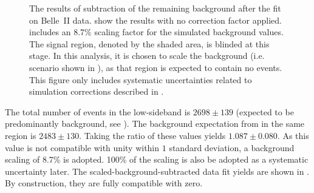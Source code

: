 \begin{figure}[htbp!]
    \centering
    \caption{\label{fig:sidebands_subtracted_figures} The results of subtraction of the remaining \BB background after the fit on Belle~II data.
     show the results with no correction factor applied.
     includes an 8.7\% scaling factor for the simulated background values.
    The signal region, denoted by the shaded area, is blinded at this stage.
    In this analysis, it is chosen to scale the background (i.e. scenario shown in ),
    as that region is expected to contain no \BtoXsgamma events.
    This figure only includes systematic uncertainties related to simulation corrections described in .
    }
\end{figure}

The total number of events in the low-\EB sideband is $2698\pm139$ (expected to be predominantly background, see ).
The background expectation from \MC in the same region is $2483\pm130$.
Taking the ratio of these values yields $1.087\pm0.080$.
As this value is not compatible with unity within $1$ standard deviation, a background scaling of 8.7\% is adopted.
100\% of the scaling is also be adopted as a systematic uncertainty later.
The scaled-background-subtracted data fit yields are shown in .
By construction, they are fully compatible with zero.

